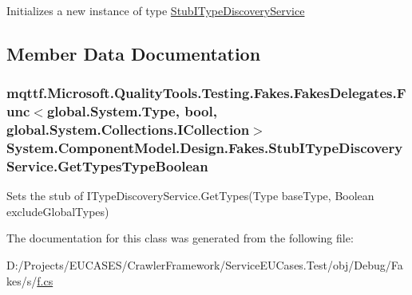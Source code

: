 Initializes a new instance of type \hyperlink{class_system_1_1_component_model_1_1_design_1_1_fakes_1_1_stub_i_type_discovery_service}{Stub\-I\-Type\-Discovery\-Service}



\subsection{Member Data Documentation}
\hypertarget{class_system_1_1_component_model_1_1_design_1_1_fakes_1_1_stub_i_type_discovery_service_a2180bcbb56fb58143b9a133cb5897140}{
\subsubsection[{Get\-Types\-Type\-Boolean}]{\setlength{\rightskip}{0pt plus 5cm}mqttf.\-Microsoft.\-Quality\-Tools.\-Testing.\-Fakes.\-Fakes\-Delegates.\-Func$<$global.\-System.\-Type, bool, global.\-System.\-Collections.\-I\-Collection$>$ System.\-Component\-Model.\-Design.\-Fakes.\-Stub\-I\-Type\-Discovery\-Service.\-Get\-Types\-Type\-Boolean}}\label{class_system_1_1_component_model_1_1_design_1_1_fakes_1_1_stub_i_type_discovery_service_a2180bcbb56fb58143b9a133cb5897140}


Sets the stub of I\-Type\-Discovery\-Service.\-Get\-Types(\-Type base\-Type, Boolean exclude\-Global\-Types)



The documentation for this class was generated from the following file\-:\begin{DoxyCompactItemize}
\item 
D\-:/\-Projects/\-E\-U\-C\-A\-S\-E\-S/\-Crawler\-Framework/\-Service\-E\-U\-Cases.\-Test/obj/\-Debug/\-Fakes/s/\hyperlink{s_2f_8cs}{f.\-cs}\end{DoxyCompactItemize}
